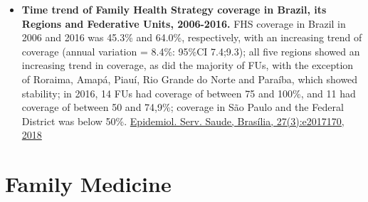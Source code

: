 \documentclass[]{book}
\begin{document}
\begin{itemize}
\item
  \textbf{Time trend of Family Health Strategy coverage in Brazil, its Regions and Federative Units, 2006-2016.} FHS coverage in Brazil in 2006 and 2016 was 45.3\% and 64.0\%, respectively, with an increasing trend of coverage (annual variation = 8.4\%: 95\%CI 7.4;9.3); all five regions showed an increasing trend in coverage, as did the majority of FUs, with the exception of Roraima, Amapá, Piauí, Rio Grande do Norte and Paraíba, which showed stability; in 2016, 14 FUs had coverage of between 75 and 100\%, and 11 had coverage of between 50 and 74,9\%; coverage in São Paulo and the Federal District was below 50\%. \href{https://www.scielosp.org/pdf/ress/2018.v27n3/e2017170/en}{Epidemiol. Serv. Saude, Brasília, 27(3):e2017170, 2018}
\end{itemize}

\hypertarget{family-medicine}{%
\section*{Family Medicine}\label{family-medicine}}
\end{document}
